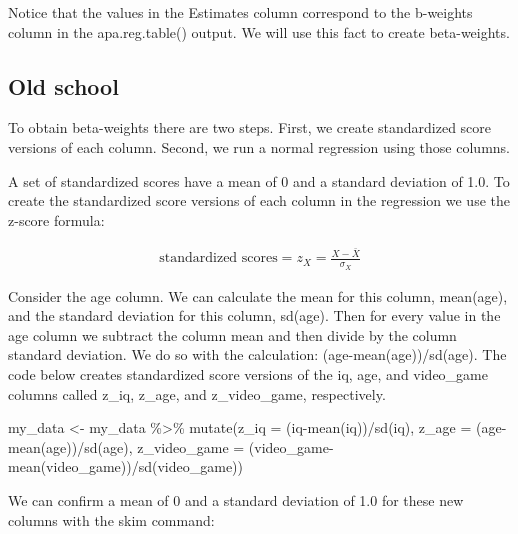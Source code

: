 \documentclass[
]{krantz}
\makeatletter
\newenvironment{Shaded}{\begin{snugshade}}{\end{snugshade}}
\newcommand{\AttributeTok}[1]{\textcolor[rgb]{0.61,0.61,0.61}{#1}}
\newcommand{\FunctionTok}[1]{\textcolor[rgb]{0,0,0}{#1}}
\newcommand{\NormalTok}[1]{#1}
\newcommand{\OtherTok}[1]{\textcolor[rgb]{0.37,0.37,0.37}{#1}}
\newcommand{\SpecialCharTok}[1]{\textcolor[rgb]{0,0,0}{#1}}
\newenvironment{kframe}{%
\medskip{}
\setlength{\fboxsep}{.8em}
 \def\at@end@of@kframe{}%
 \ifinner\ifhmode%
  \def\at@end@of@kframe{\end{minipage}}%
  \begin{minipage}{\columnwidth}%
 \fi\fi%
 \def\FrameCommand##1{\hskip\@totalleftmargin \hskip-\fboxsep
 \colorbox{shadecolor}{##1}\hskip-\fboxsep
     \hskip-\linewidth \hskip-\@totalleftmargin \hskip\columnwidth}%
 \MakeFramed {\advance\hsize-\width
   \@totalleftmargin\z@ \linewidth\hsize
   \@setminipage}}%
 {\par\unskip\endMakeFramed%
 \at@end@of@kframe}
\renewenvironment{Shaded}{\begin{kframe}}{\end{kframe}}
\makeatother
\begin{document}
Notice that the values in the Estimates column correspond to the b-weights column in the apa.reg.table() output. We will use this fact to create beta-weights.

\hypertarget{old-school}{%
\subsection{Old school}\label{old-school}}

To obtain beta-weights there are two steps. First, we create standardized score versions of each column. Second, we run a normal regression using those columns.

A set of standardized scores have a mean of 0 and a standard deviation of 1.0. To create the standardized score versions of each column in the regression we use the z-score formula:

\[
\begin{aligned}
\text{standardized scores}=z_{X} = \frac{X-\bar{X}}{\sigma_X}
\end{aligned}
\]

Consider the age column. We can calculate the mean for this column, mean(age), and the standard deviation for this column, sd(age). Then for every value in the age column we subtract the column mean and then divide by the column standard deviation. We do so with the calculation: (age-mean(age))/sd(age). The code below creates standardized score versions of the iq, age, and video\_game columns called z\_iq, z\_age, and z\_video\_game, respectively.

\begin{Shaded}
\begin{Highlighting}[]
\NormalTok{my\_data }\OtherTok{\textless{}{-}}\NormalTok{ my\_data }\SpecialCharTok{\%\textgreater{}\%} 
  \FunctionTok{mutate}\NormalTok{(}\AttributeTok{z\_iq =}\NormalTok{ (iq}\SpecialCharTok{{-}}\FunctionTok{mean}\NormalTok{(iq))}\SpecialCharTok{/}\FunctionTok{sd}\NormalTok{(iq),}
         \AttributeTok{z\_age =}\NormalTok{ (age}\SpecialCharTok{{-}}\FunctionTok{mean}\NormalTok{(age))}\SpecialCharTok{/}\FunctionTok{sd}\NormalTok{(age),}
         \AttributeTok{z\_video\_game =}\NormalTok{ (video\_game}\SpecialCharTok{{-}}\FunctionTok{mean}\NormalTok{(video\_game))}\SpecialCharTok{/}\FunctionTok{sd}\NormalTok{(video\_game))}
\end{Highlighting}
\end{Shaded}

We can confirm a mean of 0 and a standard deviation of 1.0 for these new columns with the skim command:
\end{document}
